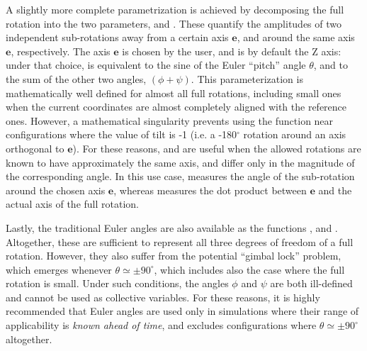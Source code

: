 A slightly more complete parametrization is achieved by decomposing the full rotation into the two parameters,  and .
These quantify the amplitudes of two independent sub-rotations away from a certain axis $\mathbf{e}$, and around the same axis $\mathbf{e}$, respectively.
The axis $\mathbf{e}$ is chosen by the user, and is by default the Z axis:
under that choice,  is equivalent to the sine of the Euler ``pitch'' angle $\theta$, and  to the sum of the other two angles, $(\phi + \psi)$.
This parameterization is mathematically well defined for almost all full rotations, including small ones when the current coordinates are almost completely aligned with the reference ones.
However, a mathematical singularity prevents using the  function near configurations where the value of tilt  is -1 (i.e.{} a -180$^\circ$ rotation around an axis orthogonal to $\mathbf{e}$).
For these reasons,  and  are useful when the allowed rotations are known to have approximately the same axis, and differ only in the magnitude of the corresponding angle.
In this use case,  measures the angle of the sub-rotation around the chosen axis $\mathbf{e}$, whereas  measures the dot product between $\mathbf{e}$ and the actual axis of the full rotation.

Lastly, the traditional Euler angles are also available as the functions ,  and .
Altogether, these are sufficient to represent all three degrees of freedom of a full rotation.
However, they also suffer from the potential ``gimbal lock'' problem, which emerges whenever $\theta \simeq \pm 90^\circ$, which includes also the case where the full rotation is small.
Under such conditions, the angles $\phi$ and $\psi$ are both ill-defined and cannot be used as collective variables.
For these reasons, it is highly recommended that Euler angles are used only in simulations where their range of applicability is \emph{known ahead of time}, and excludes configurations where  $\theta \simeq \pm 90^\circ$ altogether.


